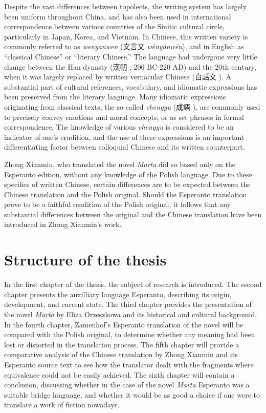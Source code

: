 Despite the vast differences between topolects, the writing system has largely been uniform throughout China, and has also been used in international correspondence between various countries of the Sinitic cultural circle, particularly in Japan, Korea, and Vietnam.
In Chinese, this written variety is commonly referred to as \textit{wenyanwen} (文言文 \textit{wényánwén}), and in English as ``classical Chinese'' or ``literary Chinese.''
The language had undergone very little change between the Han dynasty (漢朝 , 206 BC-220 AD) and the 20th century, when it was largely replaced by written vernacular Chinese (白話文 ).
A substantial part of cultural references, vocabulary, and idiomatic expressions has been preserved from the literary language.
Many idiomatic expressions originating from classical texts, the so-called \textit{chengyu} (成語 ), are commonly used to precisely convey emotions and moral concepts, or as set phrases in formal correspondence.
The knowledge of various \textit{chengyu} is considered to be an indicator of one's erudition, and the use of these expressions is an important differentiating factor between colloquial Chinese and its written counterpart.

Zhong Xianmin, who translated the novel \textit{Marta} did so based only on the Esperanto edition, without any knowledge of the Polish language.
Due to these specifics of written Chinese, certain differences are to be expected between the Chinese translation and the Polish original.
Should the Esperanto translation prove to be a faithful rendition of the Polish original, it follows that any substantial differences between the original and the Chinese translation have been introduced in Zhong Xianmin's work.

\section{Structure of the thesis}
In the first chapter of the thesis, the subject of research is introduced.
The second chapter presents the auxilliary language Esperanto, describing its origin, development, and current state.
The third chapter provides the presentation of the novel \textit{Marta} by Eliza Orzeszkowa and its historical and cultural background.
In the fourth chapter, Zamenhof's Esperanto translation of the novel will be compared with the Polish original, to determine whether any meaning had been lost or distorted in the translation process.
The fifth chapter will provide a comparative analysis of the Chinese translation by Zhong Xianmin and its Esperanto source text to see how the translator dealt with the fragments where equivalence could not be easily achieved.
The sixth chapter will contain a conclusion, discussing whether in the case of the novel \textit{Marta} Esperanto was a suitable bridge language, and whether it would be as good a choice if one were to translate a work of fiction nowadays.
